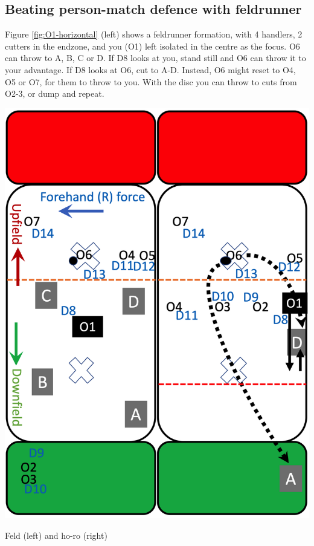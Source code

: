 \documentclass{tufte-handout}
\begin{document}
\subsection{Beating person-match defence with feldrunner}
\label{sec:feld}
Figure \ref{fig:O1-horizontal} (left) 
shows a feldrunner formation, 
with 4 handlers, 
2 cutters 
in the endzone,
and you 
(O1) 
left  
isolated 
in the centre
as the focus. 
O6 can throw 
to A,
B, 
C 
or D. 
If D8 looks at you, 
stand still and 
O6 can throw it 
to your advantage. 
If D8
looks at O6, 
cut to A-D. 
Instead, 
O6 might reset 
to O4, O5 or O7, 
for them to 
throw to you. 
With the disc 
you can throw
to cuts from O2-3, 
or dump and repeat. 

\begin{marginfigure}%
  \includegraphics[width=\linewidth]{O1-horizontal}
  \caption{Feld (left) and ho-ro (right)}
  \label{fig:O1-horizontal}
\end{marginfigure}
\end{document}
